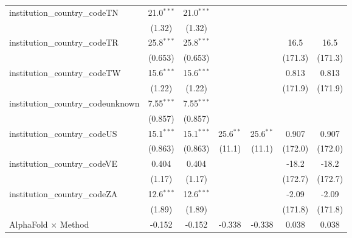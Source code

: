 \begin{tabular}{lcccccc}
   institution\_country\_codeTN          & 21.0$^{***}$  & 21.0$^{***}$  &               &               &               &   \\   
                                         & (1.32)        & (1.32)        &               &               &               &   \\   
   institution\_country\_codeTR          & 25.8$^{***}$  & 25.8$^{***}$  &               &               & 16.5          & 16.5\\   
                                         & (0.653)       & (0.653)       &               &               & (171.3)       & (171.3)\\   
   institution\_country\_codeTW          & 15.6$^{***}$  & 15.6$^{***}$  &               &               & 0.813         & 0.813\\   
                                         & (1.22)        & (1.22)        &               &               & (171.9)       & (171.9)\\   
   institution\_country\_codeunknown     & 7.55$^{***}$  & 7.55$^{***}$  &               &               &               &   \\   
                                         & (0.857)       & (0.857)       &               &               &               &   \\   
   institution\_country\_codeUS          & 15.1$^{***}$  & 15.1$^{***}$  & 25.6$^{**}$   & 25.6$^{**}$   & 0.907         & 0.907\\   
                                         & (0.863)       & (0.863)       & (11.1)        & (11.1)        & (172.0)       & (172.0)\\   
   institution\_country\_codeVE          & 0.404         & 0.404         &               &               & -18.2         & -18.2\\   
                                         & (1.17)        & (1.17)        &               &               & (172.7)       & (172.7)\\   
   institution\_country\_codeZA          & 12.6$^{***}$  & 12.6$^{***}$  &               &               & -2.09         & -2.09\\   
                                         & (1.89)        & (1.89)        &               &               & (171.8)       & (171.8)\\   
   AlphaFold $\times$ Method             & -0.152        & -0.152        & -0.338        & -0.338        & 0.038         & 0.038\\   

\end{tabular}
